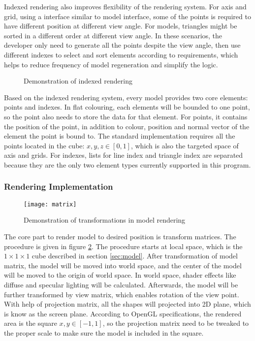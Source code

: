 Indexed rendering also improves flexibility of the rendering system. For axis and grid, using a interface similar to model interface, some of the points is required to have different position at different view angle. For models, triangles might be sorted in a different order at different view angle. In these scenarios, the developer only need to generate all the points despite the view angle, then use different indexes to select and sort elements according to requirements, which helps to reduce frequency of model regeneration and simplify the logic.

\begin{figure}[!tb]
	\centering
	 \hspace{2em}
	\caption{Demonstration of indexed rendering}
	\label{fig:index}
\end{figure}

Based on the indexed rendering system, every model provides two core elements: points and indexes. In flat colouring, each elements will be bounded to one point, so the point also needs to store the data for that element. For points, it contains the position of the point, in addition to colour, position and normal vector of the element the point is bound to. The standard implementation requires all the points located in the cube: $x, y, z \in [0, 1]$, which is also the targeted space of axis and grids. For indexes, lists for line index and triangle index are separated because they are the only two element types currently supported in this program.

\subsubsection{Rendering Implementation}

\begin{figure}[!tb]
	\centering
	\texttt{[image: matrix]}
	\caption{Demonstration of transformations in model rendering}
	\label{fig:matrix}
\end{figure}

The core part to render model to desired position is transform matrices. The procedure is given in figure \ref{fig:matrix}. The procedure starts at local space, which is the $1\times1\times1$ cube described in section \ref{sec:model}. After transformation of model matrix, the model will be moved into world space, and the center of the model will be moved to the origin of world space. In world space, shader effects like diffuse and specular lighting will be calculated. Afterwards, the model will be further transformed by view matrix, which enables rotation of the view point. With help of projection matrix, all the shapes will projected into 2D plane, which is know as the screen plane. According to OpenGL specifications, the rendered area is the square $x, y \in [-1, 1]$, so the projection matrix need to be tweaked to the proper scale to make sure the model is included in the square.

